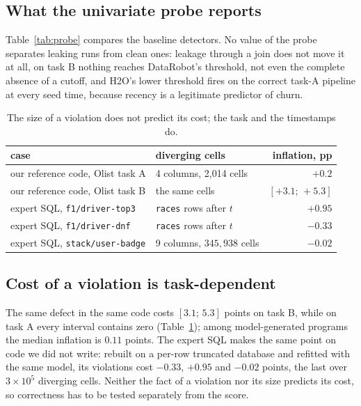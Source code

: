 \documentclass[conference]{IEEEtran}
\begin{document}
\subsection{What the univariate probe reports}\label{sec:blind}
Table~\ref{tab:probe} compares the baseline detectors. No value of the probe separates
leaking runs from clean ones: leakage through a join does not move it at all, on task B
nothing reaches DataRobot's threshold, not even the complete absence of a cutoff, and
H2O's lower threshold fires on the correct task-A pipeline at every seed time, because
recency is a legitimate predictor of churn.

\begin{table}[t]\centering
\caption{The size of a violation does not predict its cost; the task and the timestamps do.}
\label{tab:sizecost}
{\scriptsize\setlength{\tabcolsep}{3pt}
\begin{tabular}{@{}llr@{}}
\toprule
case & diverging cells & inflation, pp\\
\midrule
our reference code, Olist task A & 4 columns, 2{,}014 cells & $+0.2$\\
our reference code, Olist task B & the same cells & $[+3.1;\,+5.3]$\\
expert SQL, \texttt{f1/driver-top3} & \texttt{races} rows after $t$ & $+0.95$\\
expert SQL, \texttt{f1/driver-dnf} & \texttt{races} rows after $t$ & $-0.33$\\
expert SQL, \texttt{stack/user-badge} & 9 columns, $345{,}938$ cells & $-0.02$\\
\bottomrule
\end{tabular}}
\end{table}

\subsection{Cost of a violation is task-dependent}
The same defect in the same code costs $[3.1;\,5.3]$ points on task B, while on task
A every interval contains zero (Table~\ref{tab:sizecost}); among model-generated programs
the median inflation is $0.11$ points. The expert SQL makes the same point on code we did
not write: rebuilt on a per-row truncated database and refitted with the same model, its
violations cost $-0.33$, $+0.95$ and $-0.02$ points, the last over $3\!\times\!10^{5}$
diverging cells. Neither the fact of a violation nor its size predicts its cost, so
correctness has to be tested separately from the score.
\end{document}
